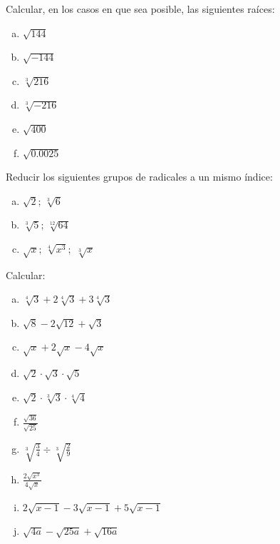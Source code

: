 \documentclass[11pt]{article}
\begin{document}
\begin{exercise}
Calcular, en los casos en que sea posible, las siguientes raíces:
\begin{multicols}{6}
    \begin{enumerate}[a)]
        \item $\sqrt{144}$
        \item $\sqrt{-144}$
        \item $\sqrt[3]{216}$
        \item $\sqrt[3]{-216}$
        \item $\sqrt{400}$
        \item $\sqrt{0.0025}$
    \end{enumerate}
\end{multicols}
\end{exercise}

\begin{exercise}
    Reducir los siguientes grupos de radicales a un mismo índice:
    \begin{multicols}{3}
        \begin{enumerate}[a)]
            \item $\sqrt{2}; \, \sqrt[3]{6} $
            \item $\sqrt[3]{5}; \, \sqrt[12]{64} $
            \item $\sqrt{x}; \, \sqrt[4]{x^3};\, \, \sqrt[3]{x} $
        \end{enumerate}
    \end{multicols}
\end{exercise}

\begin{exercise}
Calcular:
\begin{multicols}{2}
    \begin{enumerate}[a)]
        \item $\sqrt[4]{3} + 2 \sqrt[4]{3} + 3 \sqrt[4]{3} $
        \item $\sqrt{8} - 2 \sqrt{12} + \sqrt{3} $
        \item $\sqrt{x} + 2 \sqrt{x} - 4 \sqrt{x} $
        \item $\sqrt{2} \cdot \sqrt{3} \cdot \sqrt{5} $
        \item $\sqrt{2} \cdot \sqrt[3]{3} \cdot \sqrt[4]{4} $
        \item $\frac{\sqrt{36}}{\sqrt{25}}$
        \item $\sqrt[3]{\frac{3}{4}} \div {\sqrt[3]{\frac{2}{9}}}$
        \item $\frac{2 \sqrt{x^3}}{4 \sqrt{x}} $
        \item $2 \sqrt{x-1} - 3 \sqrt{x-1} + 5 \sqrt{x-1} $
        \item $\sqrt{4a} - \sqrt{25 a} + \sqrt{16 a} $
    \end{enumerate}
\end{multicols}
\end{exercise}
\end{document}
